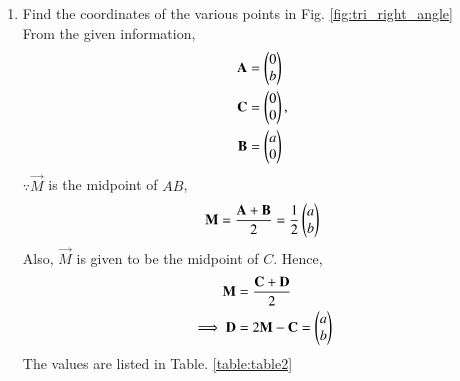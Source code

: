 \begin{enumerate}[label=\thesection.\arabic*.,ref=\thesection.\theenumi]
%
\item Find the coordinates of the various points in Fig. \ref{fig:tri_right_angle}
\label{const:tri_right_angle}
\\
%
\solution From the given information, 
\begin{align}
\label{eq:constr_a}
\mathbf{A} &= \begin{pmatrix}0\\b\end{pmatrix} 
\\
 \mathbf{C} &= \begin{pmatrix}0\\0\end{pmatrix}, 
\label{eq:constr_c}
\\
\mathbf{B} &= \begin{pmatrix}a\\0\end{pmatrix}
\label{eq:constr_b}
\end{align}
$\because \vec{M}$ is the midpoint of $AB$,
\begin{align}
\mathbf{M}= \frac{\mathbf{A}+\mathbf{B}}{2} = \frac{1}{2}\begin{pmatrix}a\\b\end{pmatrix}
\label{eq:constr_m}
\end{align}
%
Also, $\vec{M}$ is given to be the midpoint of $C$.  Hence, 
\begin{align}
\mathbf{M}&= \frac{\mathbf{C}+\mathbf{D}}{2}
\\
\implies \mathbf{D} &= 2 \mathbf{M} - \mathbf{C} = \begin{pmatrix}a\\b\end{pmatrix}
\label{eq:constr_d}
\end{align}
%
The values are listed in 
Table. \ref{table:table2} 
\begin{table}[ht!]

\caption{To construct $\triangle DBC$}
\label{table:table2}


\end{table}
\end{enumerate}
